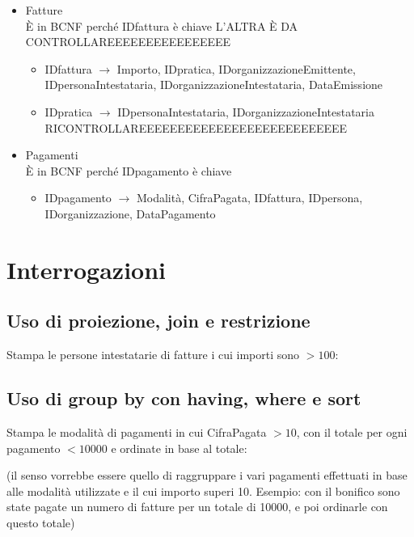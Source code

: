 \documentclass[a4paper,12pt]{article}
\begin{document}
\begin{itemize}
\item Fatture\\È in BCNF perché IDfattura è chiave L'ALTRA È DA CONTROLLAREEEEEEEEEEEEEEEE

\begin{itemize}
\item IDfattura $\rightarrow$ Importo, IDpratica, IDorganizzazioneEmittente, IDpersonaIntestataria, IDorganizzazioneIntestataria, DataEmissione

\item IDpratica $\rightarrow$ IDpersonaIntestataria, IDorganizzazioneIntestataria RICONTROLLAREEEEEEEEEEEEEEEEEEEEEEEEEEE
\end{itemize}

\item Pagamenti\\È in BCNF perché IDpagamento è chiave

\begin{itemize}
\item IDpagamento $\rightarrow$ Modalità, CifraPagata, IDfattura, IDpersona, IDorganizzazione, DataPagamento
\end{itemize}

\end{itemize}

 \section{ Interrogazioni }


 \subsection{ Uso di proiezione, join e restrizione }
Stampa le persone intestatarie di fatture i cui importi sono $> 100$:

\begin{minipage}{\textwidth}

\end{minipage}


 \subsection{ Uso di group by con having, where e sort }

Stampa le modalità di pagamenti in cui CifraPagata $> 10$, con il totale per ogni pagamento $< 10000$ e ordinate in base al totale:

(il senso vorrebbe essere quello di raggruppare i vari pagamenti effettuati in base alle modalità utilizzate e il cui importo superi 10. Esempio: con il bonifico sono state pagate un numero di fatture per un totale di 10000, e poi ordinarle con questo totale)
\end{document}
